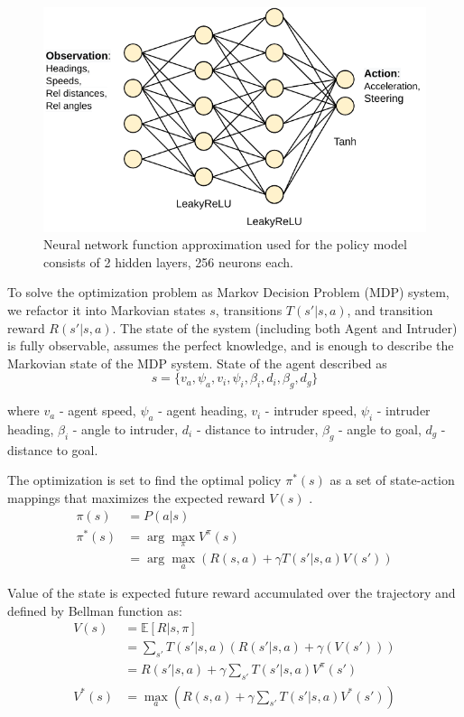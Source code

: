 \begin{figure}[h]
	\centering
	\includegraphics[width=0.7\linewidth]{figures/model.pdf}
	\caption{Neural network function approximation used for the policy model consists of 2 hidden layers, 256 neurons each.}
	\label{fig:policy_model}
\end{figure}

To solve the optimization problem as Markov Decision Problem (MDP) system, we refactor it into Markovian states $s$, transitions  $T(s' | s, a)$, and transition reward $R(s' | s, a)$. 
The state of the system (including both Agent and Intruder) is fully observable, assumes the perfect knowledge, and is enough to describe the Markovian state of the MDP system.
State of the agent described as
$$ s = \{ v_a, \psi_a, v_i, \psi_i, \beta_i, d_i, \beta_g, d_g \}$$

where 
$v_a$ - agent speed,
$\psi_a$ - agent heading,
$v_i$ - intruder speed,
$\psi_i$ - intruder heading,
$\beta_i$ - angle to intruder,
$d_i$ - distance to intruder,
$\beta_g$ - angle to goal,
$d_g$ - distance to goal. 

The optimization is set to find the optimal policy $\pi^*(s)$ as a set of state-action mappings that maximizes the expected reward $V(s)$ \cite{sutton2018reinforcement}.
\begin{align} 
	\pi(s) &= P(a | s) \\
	\pi^*(s) &= \arg\max_{\pi} V^\pi (s) \\
	&= \arg\max_a \left( R(s,a) + \gamma T(s'|s,a) V(s') \right)
\end{align} 

Value of the state is expected future reward accumulated over the trajectory and defined by Bellman function as:
\begin{align}
	V(s) &=  \mathbb{E} [R | s, \pi] \\
	&= \sum_{s'} T(s'|s,a) \left( R(s'|s,a) + \gamma ( V(s')) \right) \\
	&=  R(s'|s,a) + \gamma \sum_{s'} T(s'|s,a) V^{\pi}(s') \\
	V^{*}(s) &= \max_{a} \left( R(s,a) + \gamma \sum_{s'} T(s'|s,a) V^{*}(s') \right)
\end{align}

